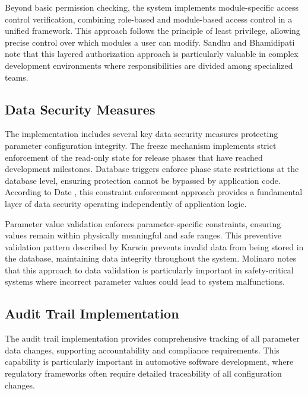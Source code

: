     Beyond basic permission checking, the system implements module-specific access control verification, combining role-based and module-based access control in a unified framework. This approach follows the principle of least privilege, allowing precise control over which modules a user can modify. Sandhu and Bhamidipati \cite{sandhu1997arbac97} note that this layered authorization approach is particularly valuable in complex development environments where responsibilities are divided among specialized teams.
    
    \subsection{Data Security Measures}
    \label{subsec:data-security-measures}
    
    The implementation includes several key data security measures protecting parameter configuration integrity. The freeze mechanism implements strict enforcement of the read-only state for release phases that have reached development milestones. Database triggers enforce phase state restrictions at the database level, ensuring protection cannot be bypassed by application code. According to Date \cite{date2011sql}, this constraint enforcement approach provides a fundamental layer of data security operating independently of application logic.
    
    Parameter value validation enforces parameter-specific constraints, ensuring values remain within physically meaningful and safe ranges. This preventive validation pattern described by Karwin \cite{karwin2010sql} prevents invalid data from being stored in the database, maintaining data integrity throughout the system. Molinaro \cite{molinaro2005sql} notes that this approach to data validation is particularly important in safety-critical systems where incorrect parameter values could lead to system malfunctions.
    
    \subsection{Audit Trail Implementation}
    \label{subsec:audit-trail-implementation}
    
    The audit trail implementation provides comprehensive tracking of all parameter data changes, supporting accountability and compliance requirements. This capability is particularly important in automotive software development, where regulatory frameworks often require detailed traceability of all configuration changes.
    
